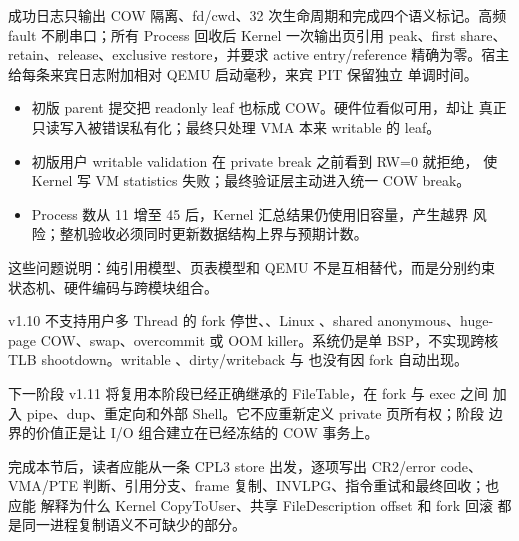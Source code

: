 成功日志只输出 COW 隔离、fd/cwd、32 次生命周期和完成四个语义标记。高频
fault 不刷串口；所有 Process 回收后 Kernel 一次输出页引用 peak、first
share、retain、release、exclusive restore，并要求 active entry/reference
精确为零。宿主给每条来宾日志附加相对 QEMU 启动毫秒，来宾 PIT 保留独立
单调时间。

\par
\begin{itemize}
  \item 初版 parent 提交把 readonly leaf 也标成 COW。硬件位看似可用，却让
        真正只读写入被错误私有化；最终只处理 VMA 本来 writable 的 leaf。
  \item 初版用户 writable validation 在 private break 之前看到 RW=0 就拒绝，
        使 Kernel 写 VM statistics 失败；最终验证层主动进入统一 COW break。
  \item Process 数从 11 增至 45 后，Kernel 汇总结果仍使用旧容量，产生越界
        风险；整机验收必须同时更新数据结构上界与预期计数。
\end{itemize}

这些问题说明：纯引用模型、页表模型和 QEMU 不是互相替代，而是分别约束
状态机、硬件编码与跨模块组合。

v1.10 不支持用户多 Thread 的 fork 停世、、Linux
、shared anonymous、huge-page COW、swap、overcommit 或 OOM
killer。系统仍是单 BSP，不实现跨核 TLB shootdown。writable
、dirty/writeback 与  也没有因 fork 自动出现。

下一阶段 v1.11 将复用本阶段已经正确继承的 FileTable，在 fork 与 exec 之间
加入 pipe、dup、重定向和外部 Shell。它不应重新定义 private 页所有权；阶段
边界的价值正是让 I/O 组合建立在已经冻结的 COW 事务上。

\begin{contractbox}
完成本节后，读者应能从一条 CPL3 store 出发，逐项写出 CR2/error code、
VMA/PTE 判断、引用分支、frame 复制、INVLPG、指令重试和最终回收；也应能
解释为什么 Kernel CopyToUser、共享 FileDescription offset 和 fork 回滚
都是同一进程复制语义不可缺少的部分。
\end{contractbox}
